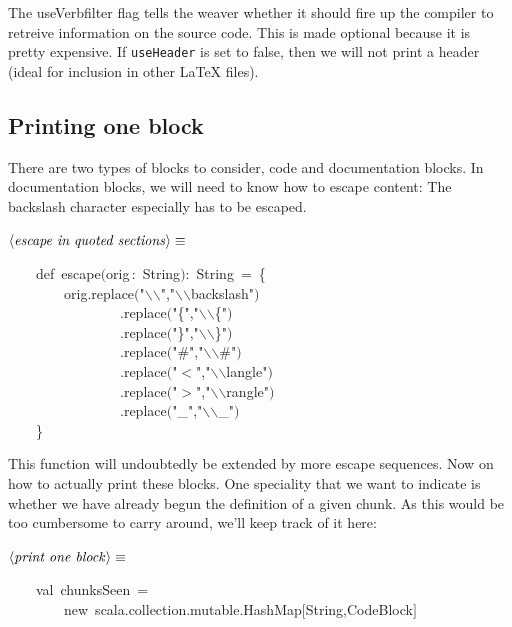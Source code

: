 \documentclass[a4paper,12pt]{article}
\begin{document}
The useVerbfilter flag tells the weaver whether it should fire up the compiler
to retreive information on the source code. This is made optional because
it is pretty expensive. If \texttt{useHeader} is set to false, then we will not
print a header (ideal for inclusion in other LaTeX files).

\subsection{Printing one block}
There are two types of blocks to consider, code and documentation blocks. In
documentation blocks, we will need to know how to escape content: The backslash
character especially has to be escaped.

$\left<\mbox{\emph{escape in quoted sections}}\right>\equiv$
\begin{program}~~~~{\vem def}~escape$($orig\,{\rm :}~String$)${\rm :}~String~=~{\small\{}
\\~~~~~~~~orig.replace$($"$\backslash$$\backslash$","\Dollar$\backslash$$\backslash$backslash\Dollar"$)$
\\~~~~~~~~~~~~~~~~.replace$($"{\small\{}","\Dollar$\backslash$$\backslash${\small\{}\Dollar"$)$
\\~~~~~~~~~~~~~~~~.replace$($"{\small\}}","\Dollar$\backslash$$\backslash${\small\}}\Dollar"$)$
\\~~~~~~~~~~~~~~~~.replace$($"\#","\Dollar$\backslash$$\backslash$\#\Dollar"$)$
\\~~~~~~~~~~~~~~~~.replace$($"$<$","\Dollar$\backslash$$\backslash$langle\Dollar"$)$
\\~~~~~~~~~~~~~~~~.replace$($"$>$","\Dollar$\backslash$$\backslash$rangle\Dollar"$)$
\\~~~~~~~~~~~~~~~~.replace$($"\_","$\backslash$$\backslash$\_"$)$
\\~~~~{\small\}}
\\[0.5em]\end{program}



This function will undoubtedly be extended by more escape sequences. Now on
how to actually print these blocks. One speciality that we want to indicate
is whether we have already begun the definition of a given chunk. As this
would be too cumbersome to carry around, we'll keep track of it here:

$\left<\mbox{\emph{print one block}}\right>\equiv$
\begin{program}~~~~{\vem val}~chunksSeen~=
\\~~~~~~~~{\vem new}~scala.collection.mutable.HashMap$[$String,CodeBlock$]$
\\[0.5em]\end{program}
\end{document}
